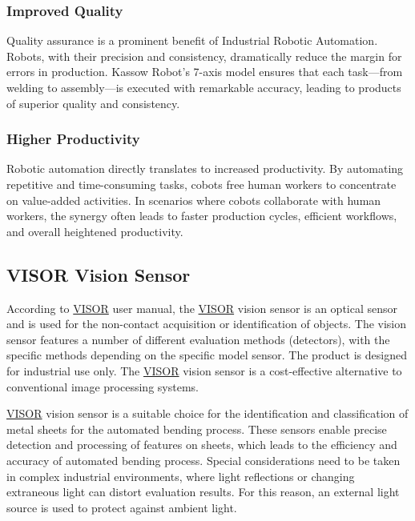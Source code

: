 \subsubsection*{Improved Quality}
Quality assurance is a prominent benefit of Industrial Robotic Automation. Robots, with their precision and consistency, dramatically reduce the margin for errors in production. 
Kassow Robot's 7-axis model ensures that each task—from welding to assembly—is executed with remarkable accuracy, leading to products of superior quality and consistency.

\subsubsection*{Higher Productivity}

Robotic automation directly translates to increased productivity. By automating repetitive and time-consuming tasks, cobots free human workers to concentrate on value-added activities. 
In scenarios where cobots collaborate with human workers, the synergy often leads to faster production cycles, efficient workflows, and overall heightened productivity.

\subsection{VISOR\textsuperscript{\textregistered} Vision Sensor}
\label{sec:visor_3}

According to \hyperref[acro:VISOR]{VISOR}\textsuperscript{\textregistered} \cite[page 22]{visor_user_manual} user manual, the \hyperref[acro:VISOR]{VISOR}\textsuperscript{\textregistered} vision sensor is an optical sensor and is used for the non-contact acquisition or identification of objects.
The vision sensor features a number of different evaluation methods (detectors), with the specific methods
depending on the specific model sensor. The product is designed for industrial use only. The \hyperref[acro:VISOR]{VISOR}\textsuperscript{\textregistered} vision sensor is a cost-effective alternative to conventional image processing systems.

\hyperref[acro:VISOR]{VISOR}\textsuperscript{\textregistered} vision sensor is a suitable choice for the identification and classification of metal sheets for the automated bending process.
These sensors enable precise detection and processing of features on sheets, which leads to the efficiency and accuracy of automated bending process.
Special considerations need to be taken in complex industrial environments, where light reflections or changing extraneous light can distort evaluation results. For this reason, an external light source is used to protect against ambient light.